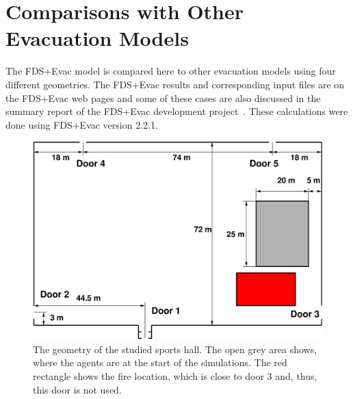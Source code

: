 \documentclass[12pt,a4paper,final,twoside]{stylevk}
\begin{document}
\section{Comparisons with Other Evacuation
  Models}\label{Sec_CompOtherModels} 

\noindent The FDS+Evac model is compared here to other evacuation
models using four different geometries.  The FDS+Evac results and
corresponding input files are on the FDS+Evac web pages and some of
these cases are also discussed in the summary report of the FDS+Evac
development project~\cite{Hostikka07a}.  These calculations were done
using FDS+Evac version 2.2.1.
%


%
\begin{figure}[!b]
  \centerline{\includegraphics[clip=true,
  width=120mm]{FIGURES/SportHallGeom}} 
  \caption{The geometry of the studied sports hall.  The open grey
    area shows, where the agents are at the start of the simulations.
    The red rectangle shows the fire location, which is close to door
    3 and, thus, this door is not used.}\label{Fig_SportGeom}
\end{figure}
%
\end{document}
